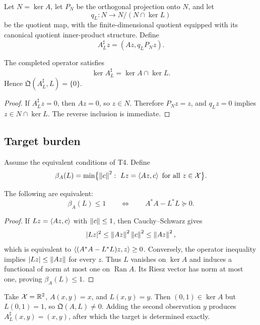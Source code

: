 Let $N=\ker A$, let $P_N$ be the orthogonal projection onto $N$, and let
\[
q_L:N\to N/(N\cap\ker L)
\]
be the quotient map, with the finite-dimensional quotient equipped with its canonical quotient inner-product structure. Define
\begin{equation}
A_L^{\sharp}z=(Az,q_LP_Nz).
\label{eq:completion}
\end{equation}

\begin{theorem}
The completed operator satisfies
\begin{equation}
\ker A_L^{\sharp}=\ker A\cap\ker L.
\label{eq:completion-kernel}
\end{equation}
Hence $\mathfrak Q(A_L^{\sharp},L)=\{0\}$.
\end{theorem}

\begin{proof}
If $A_L^{\sharp}z=0$, then $Az=0$, so $z\in N$. Therefore $P_Nz=z$, and $q_Lz=0$ implies $z\in N\cap\ker L$. The reverse inclusion is immediate.
\end{proof}

\subsection{Target burden}

Assume the equivalent conditions of T4. Define
\begin{equation}
\beta_A(L)=\min\bigl\{\norm c^2:\ Lz=\inner{Az}{c}\ \text{for all }z\in\X\bigr\}.
\label{eq:burden}
\end{equation}

\begin{theorem}
The following are equivalent:
\begin{equation}
\beta_A(L)\le1
\qquad\Longleftrightarrow\qquad
A^*A-L^*L\succeq0.
\label{eq:support}
\end{equation}
\end{theorem}

\begin{proof}
If $Lz=\left\langle Az,c\right\rangle$ with $\left\lVert c\right\rVert\le1$, then Cauchy--Schwarz gives
\[
|Lz|^2\le\left\lVert Az\right\rVert^2\left\lVert c\right\rVert^2\le\left\lVert Az\right\rVert^2,
\]
which is equivalent to $\left\langle(A^*A-L^*L)z,z\right\rangle\ge0$. Conversely, the operator inequality implies $|Lz|\le\left\lVert Az\right\rVert$ for every $z$. Thus $L$ vanishes on $\ker A$ and induces a functional of norm at most one on $\operatorname{Ran}A$. Its Riesz vector has norm at most one, proving $\beta_A(L)\le1$.
\end{proof}

\begin{example}
Take $\mathcal X=\mathbb R^2$, $A(x,y)=x$, and $L(x,y)=y$. Then $(0,1)\in\ker A$ but $L(0,1)=1$, so $\mathfrak Q(A,L)\neq0$. Adding the second observation $y$ produces $A_L^{\sharp}(x,y)=(x,y)$, after which the target is determined exactly.
\end{example}
